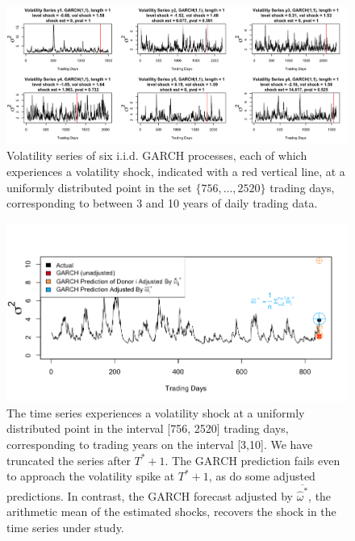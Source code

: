 \documentclass[11pt,3p,review,authoryear]{elsarticle}
\theoremstyle{definition}
\begin{document}
\begin{figure}[h!]
  \begin{center}
    \includegraphics[scale=.4]{simulation_plots/vol_series_six_plots.png}
    \caption{Volatility series of six i.i.d. GARCH processes, each of which experiences a volatility shock, indicated with a red vertical line, at a uniformly distributed point in the set $\{756,...,2520\}$ trading days, corresponding to between 3 and 10 years of daily trading data.}
    \label{fig:six_plots}
    \end{center}
  \end{figure}

  \begin{figure}[h!]
    \begin{center}
      \includegraphics[scale=.4]{simulation_plots/motivating_piece_arithmetic_mean.png}
      \caption{The time series experiences a volatility shock at a uniformly distributed point in the interval [756, 2520] trading days, corresponding to trading years on the interval [3,10].  We have truncated the series after $T^{*}+1$.  The GARCH prediction fails even to approach the volatility spike at $T^{*}+1$, as do some adjusted predictions.  In contrast, the GARCH forecast adjusted by $\overline{\hat\omega^{*}}$, the arithmetic mean of the estimated shocks, recovers the shock in the time series under study.} 
      \label{fig:arith_mean_example_introduction}
      \end{center}
    \end{figure}
\end{document}
